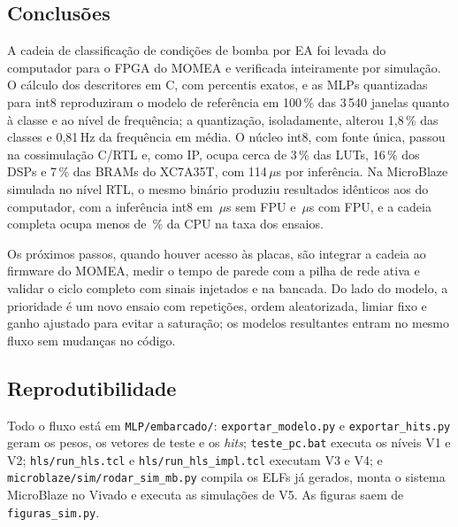 \subsection{Conclusões}
\label{sim:sec:conclusoes}

A cadeia de classificação de condições de bomba por EA foi levada do computador para o FPGA do MOMEA e verificada inteiramente por simulação. O cálculo dos descritores em C, com percentis exatos, e as MLPs quantizadas para int8 reproduziram o modelo de referência em 100\,\% das 3\,540 janelas quanto à classe e ao nível de frequência; a quantização, isoladamente, alterou 1,8\,\% das classes e 0,81\,Hz da frequência em média. O núcleo int8, com fonte única, passou na cossimulação C/RTL e, como IP, ocupa cerca de 3\,\% das LUTs, 16\,\% dos DSPs e 7\,\% das BRAMs do XC7A35T, com 114\,\(\mu\)s por inferência. Na MicroBlaze simulada no nível RTL, o mesmo binário produziu resultados idênticos aos do computador, com a inferência int8 em \mbMlpIntSoftUs\,\(\mu\)s sem FPU e \mbMlpIntFpuUs\,\(\mu\)s com FPU, e a cadeia completa ocupa menos de \mbCargaEnsaioMax\,\% da CPU na taxa dos ensaios.

Os próximos passos, quando houver acesso às placas, são integrar a cadeia ao firmware do MOMEA, medir o tempo de parede com a pilha de rede ativa e validar o ciclo completo com sinais injetados e na bancada. Do lado do modelo, a prioridade é um novo ensaio com repetições, ordem aleatorizada, limiar fixo e ganho ajustado para evitar a saturação; os modelos resultantes entram no mesmo fluxo sem mudanças no código.

\subsection*{Reprodutibilidade}

Todo o fluxo está em \texttt{MLP/embarcado/}: \texttt{exportar\_modelo.py} e \texttt{exportar\_hits.py} geram os pesos, os vetores de teste e os \textit{hits}; \texttt{teste\_pc.bat} executa os níveis V1 e V2; \texttt{hls/run\_hls.tcl} e \texttt{hls/run\_hls\_impl.tcl} executam V3 e V4; e \texttt{microblaze/sim/rodar\_sim\_mb.py} compila os ELFs já gerados, monta o sistema MicroBlaze no Vivado e executa as simulações de V5. As figuras saem de \texttt{figuras\_sim.py}.

